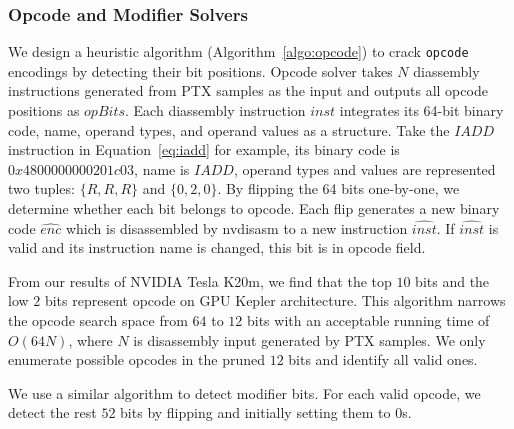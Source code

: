 \subsubsection{Opcode and Modifier Solvers}
We design a heuristic algorithm (Algorithm~\ref{algo:opcode}) to crack {\tt opcode} encodings by detecting their bit positions.
Opcode solver takes $N$ diassembly instructions generated from PTX samples as the input and outputs all opcode positions as $opBits$.
Each diassembly instruction $inst$ integrates its 64-bit binary code, name, operand types, and operand values as a structure.
Take the $IADD$ instruction in Equation~\ref{eq:iadd} for example, its binary code is $0x4800000000201c03$, name is $IADD$, operand types and values are represented two tuples: $\{ R,R,R \}$ and $\{ 0,2,0 \}$.
By flipping the 64 bits one-by-one, we determine whether each bit belongs to opcode.
Each flip generates a new binary code $\widehat{enc}$ which is disassembled by nvdisasm to a new instruction $\widehat{inst}$.
If $\widehat{inst}$ is valid and its instruction name is changed, this bit is in opcode field.


From our results of NVIDIA Tesla K20m, we find that the top $10$ bits and the low $2$ bits represent opcode on GPU Kepler architecture.
This algorithm narrows the opcode search space from $64$ to $12$ bits with an acceptable running time of $O(64N)$, where $N$ is disassembly input generated by PTX samples.
We only enumerate possible opcodes in the pruned $12$ bits and identify all valid ones.

We use a similar algorithm to detect modifier bits.
For each valid opcode, we detect the rest $52$ bits by flipping and initially setting them to $0$s.

